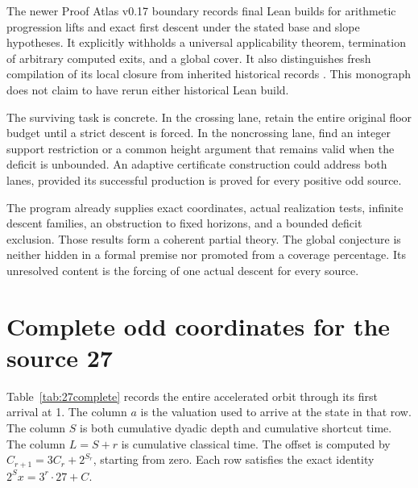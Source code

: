 The newer Proof Atlas v0.17 boundary records final Lean builds for arithmetic progression lifts and exact first descent under the stated base and slope hypotheses. It explicitly withholds a universal applicability theorem, termination of arbitrary computed exits, and a global cover. It also distinguishes fresh compilation of its local closure from inherited historical records \cite{projectcollatzboundary}. This monograph does not claim to have rerun either historical Lean build.

The surviving task is concrete. In the crossing lane, retain the entire original floor budget until a strict descent is forced. In the noncrossing lane, find an integer support restriction or a common height argument that remains valid when the deficit is unbounded. An adaptive certificate construction could address both lanes, provided its successful production is proved for every positive odd source.

The program already supplies exact coordinates, actual realization tests, infinite descent families, an obstruction to fixed horizons, and a bounded deficit exclusion. Those results form a coherent partial theory. The global conjecture is neither hidden in a formal premise nor promoted from a coverage percentage. Its unresolved content is the forcing of one actual descent for every source.

\appendix
\section{Complete odd coordinates for the source 27}\label{app:orbit27}
Table~\ref{tab:27complete} records the entire accelerated orbit through its first arrival at 1. The column $a$ is the valuation used to arrive at the state in that row. The column $S$ is both cumulative dyadic depth and cumulative shortcut time. The column $L=S+r$ is cumulative classical time. The offset is computed by $C_{r+1}=3C_r+2^{S_r}$, starting from zero. Each row satisfies the exact identity $2^Sx=3^r\cdot27+C$.

